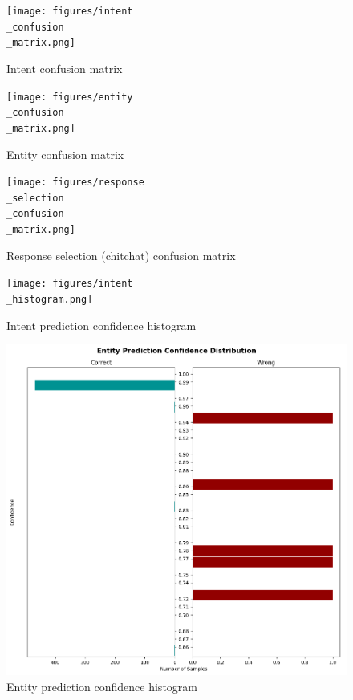 \documentclass[journal, 11pt]{IEEEtran}
\begin{document}

% 
% 



\onecolumn

\begin{figure}[ht]
    \centering
    \texttt{[image: figures/intent\\\_confusion\\\_matrix.png]}
    \caption{Intent confusion matrix}
    \label{fig:intent-conf-mat}
\end{figure}

\begin{figure}[ht]
    \centering
    \texttt{[image: figures/entity\\\_confusion\\\_matrix.png]}
    \caption{Entity confusion matrix}
    \label{fig:ents-conf-mat}
\end{figure}

\begin{figure}[ht]
    \centering
    \texttt{[image: figures/response\\\_selection\\\_confusion\\\_matrix.png]}
    \caption{Response selection (chitchat) confusion matrix}
    \label{fig:resp-sel-conf-mat}
\end{figure}

\begin{figure}[ht]
    \centering
    \texttt{[image: figures/intent\\\_histogram.png]}
    \caption{Intent prediction confidence histogram}
    \label{fig:intent-hist}
\end{figure}

\begin{figure}[ht]
    \centering
    \includegraphics[width=\textwidth]{figures/DIETClassifier_histogram.png}
    \caption{Entity prediction confidence histogram}
    \label{fig:ents-hist}
\end{figure}
\end{document}
